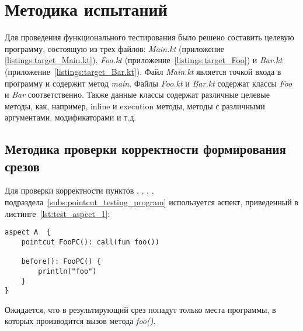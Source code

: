\section{Методика испытаний}
\label{sec:testing_methodology}
Для проведения функционального тестирования было решено составить целевую программу, состоящую из трех файлов: \textit{Main.kt} (приложение \ref{listings:target_Main.kt}), \textit{Foo.kt} (приложение~\ref{listings:target_Foo}) и \textit{Bar.kt} (приложение~\ref{listings:target_Bar.kt}).
Файл \textit{Main.kt} является точкой входа в программу и содержит метод \textit{main}.
Файлы \textit{Foo.kt} и \textit{Bar.kt} содержат классы \textit{Foo} и \textit{Bar} соответственно.
Также данные классы содержат различные целевые методы, как, например, inline и execution методы, методы с различными аргументами, модификаторами и т.д.
\subsection{Методика проверки корректности формирования срезов}
\label{sub:pointcut_building_methodology}
Для проверки корректности пунктов
\quotes{\ref{list:method_name_check}},
\quotes{\ref{list:class_name_check}},
\quotes{\ref{list:method_params_check}},
\quotes{\ref{list:call_check}},
\quotes{\ref{list:reference_pointcut_check}} подраздела~\ref{subs:pointcut_testing_program} используется аспект, приведенный в листинге~\ref{lst:test_aspect_1}:
\begin{lstlisting}[style={java}, label={lst:test_aspect_1},
  caption={Пример тестового аспекта}]
aspect A  {
    pointcut FooPC(): call(fun foo())

    before(): FooPC() {
        println("foo")
    }
}
\end{lstlisting}

Ожидается, что в результирующий срез попадут только места программы, в которых производится вызов метода \textit{foo()}.

